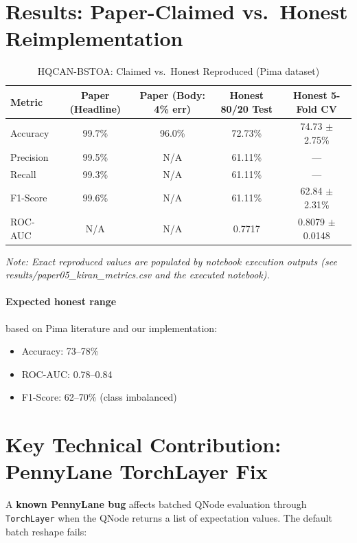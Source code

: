 \documentclass[12pt,a4paper]{article}
\begin{document}
\section{Results: Paper-Claimed vs.\ Honest Reimplementation}
\begin{table}[h!]
  \centering
  \caption{HQCAN-BSTOA: Claimed vs.\ Honest Reproduced (Pima dataset)}
  \begin{tabular}{lcccc}
    \toprule
    \textbf{Metric} & \textbf{Paper (Headline)} & \textbf{Paper (Body: 4\% err)} & \textbf{Honest 80/20 Test} & \textbf{Honest 5-Fold CV}\\
    \midrule
    Accuracy  & 99.7\% & 96.0\%  & 72.73\% & 74.73 $\pm$ 2.75\%\\
    Precision & 99.5\% & N/A     & 61.11\% & ---\\
    Recall    & 99.3\% & N/A     & 61.11\% & ---\\
    F1-Score  & 99.6\% & N/A     & 61.11\% & 62.84 $\pm$ 2.31\%\\
    ROC-AUC   & N/A    & N/A     & 0.7717  & 0.8079 $\pm$ 0.0148\\
    \bottomrule
  \end{tabular}
\end{table}

\noindent\textit{Note: Exact reproduced values are populated by notebook execution outputs (see results/paper05\_kiran\_metrics.csv and the executed notebook).}

\paragraph{Expected honest range} based on Pima literature and our implementation:
\begin{itemize}[leftmargin=*]
  \item Accuracy: 73--78\%
  \item ROC-AUC: 0.78--0.84
  \item F1-Score: 62--70\% (class imbalanced)
\end{itemize}

\section{Key Technical Contribution: PennyLane TorchLayer Fix}
A \textbf{known PennyLane bug} affects batched QNode evaluation through \texttt{TorchLayer} when the QNode returns a list of expectation values. The default batch reshape fails:
\end{document}
